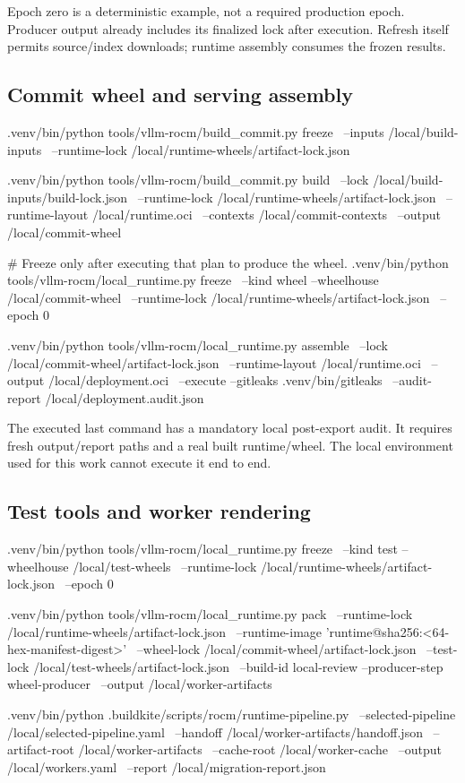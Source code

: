 \documentclass[11pt,a4paper]{article}
\begin{document}
Epoch zero is a deterministic example, not a required production epoch. Producer
output already includes its finalized lock after execution. Refresh itself
permits source/index downloads; runtime assembly consumes the frozen results.

\subsection{Commit wheel and serving assembly}

\begin{Code}
.venv/bin/python tools/vllm-rocm/build_commit.py freeze \
  --inputs /local/build-inputs \
  --runtime-lock /local/runtime-wheels/artifact-lock.json

.venv/bin/python tools/vllm-rocm/build_commit.py build \
  --lock /local/build-inputs/build-lock.json \
  --runtime-lock /local/runtime-wheels/artifact-lock.json \
  --runtime-layout /local/runtime.oci \
  --contexts /local/commit-contexts \
  --output /local/commit-wheel

# Freeze only after executing that plan to produce the wheel.
.venv/bin/python tools/vllm-rocm/local_runtime.py freeze \
  --kind wheel --wheelhouse /local/commit-wheel \
  --runtime-lock /local/runtime-wheels/artifact-lock.json \
  --epoch 0

.venv/bin/python tools/vllm-rocm/local_runtime.py assemble \
  --lock /local/commit-wheel/artifact-lock.json \
  --runtime-layout /local/runtime.oci \
  --output /local/deployment.oci \
  --execute --gitleaks .venv/bin/gitleaks \
  --audit-report /local/deployment.audit.json
\end{Code}

The executed last command has a mandatory local post-export audit. It requires
fresh output/report paths and a real built runtime/wheel. The local environment
used for this work cannot execute it end to end.

\subsection{Test tools and worker rendering}

\begin{Code}
.venv/bin/python tools/vllm-rocm/local_runtime.py freeze \
  --kind test --wheelhouse /local/test-wheels \
  --runtime-lock /local/runtime-wheels/artifact-lock.json \
  --epoch 0

.venv/bin/python tools/vllm-rocm/local_runtime.py pack \
  --runtime-lock /local/runtime-wheels/artifact-lock.json \
  --runtime-image 'runtime@sha256:<64-hex-manifest-digest>' \
  --wheel-lock /local/commit-wheel/artifact-lock.json \
  --test-lock /local/test-wheels/artifact-lock.json \
  --build-id local-review --producer-step wheel-producer \
  --output /local/worker-artifacts

.venv/bin/python .buildkite/scripts/rocm/runtime-pipeline.py \
  --selected-pipeline /local/selected-pipeline.yaml \
  --handoff /local/worker-artifacts/handoff.json \
  --artifact-root /local/worker-artifacts \
  --cache-root /local/worker-cache \
  --output /local/workers.yaml \
  --report /local/migration-report.json
\end{Code}
\end{document}
